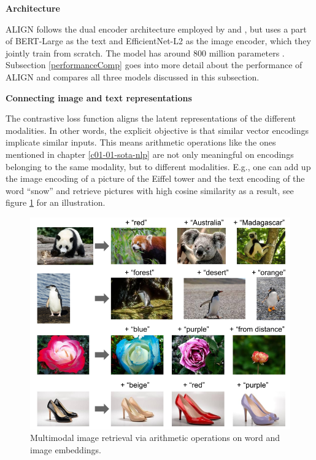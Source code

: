 \documentclass[
]{krantz}
\begin{document}
\textbf{Architecture}

ALIGN follows the dual encoder architecture employed by \citet{zhang2020contrastive} and \citet{radford2021learning}, but uses a part of BERT-Large as the text and EfficientNet-L2 as the image encoder, which they jointly train from scratch.
The model has around 800 million parameters \citep{alford2021alignparams}.
Subsection \ref{performanceComp} goes into more detail about the performance of ALIGN and compares all three models discussed in this subsection.

\textbf{Connecting image and text representations}

The contrastive loss function aligns the latent representations of the different modalities.
In other words, the explicit objective is that similar vector encodings implicate similar inputs.
This means arithmetic operations like the ones mentioned in chapter \ref{c01-01-sota-nlp} are not only meaningful on encodings belonging to the same modality, but to different modalities.
E.g., one can add up the image encoding of a picture of the Eiffel tower and the text encoding of the word ``snow'' and retrieve pictures with high cosine similarity as a result, see figure \ref{fig:img-txt-addition} for an illustration.

\begin{figure}

{\centering \includegraphics[width=1\linewidth]{figures/02-04-text-support-img/align-word-and-image-addition} 

}

\caption{Multimodal image retrieval via arithmetic operations on word and image embeddings.}\label{fig:img-txt-addition}
\end{figure}
\end{document}
